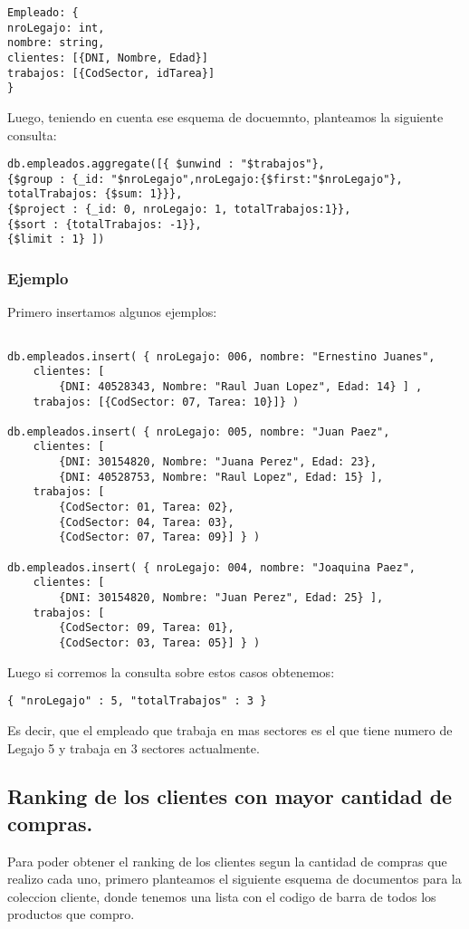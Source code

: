 \begin{lstlisting}
Empleado: {
nroLegajo: int,
nombre: string,
clientes: [{DNI, Nombre, Edad}]
trabajos: [{CodSector, idTarea}]
}
\end{lstlisting}

Luego, teniendo en cuenta ese esquema de docuemnto, planteamos la siguiente consulta:
\begin{lstlisting}
db.empleados.aggregate([{ $unwind : "$trabajos"},
{$group : {_id: "$nroLegajo",nroLegajo:{$first:"$nroLegajo"},
totalTrabajos: {$sum: 1}}},
{$project : {_id: 0, nroLegajo: 1, totalTrabajos:1}},
{$sort : {totalTrabajos: -1}},
{$limit : 1} ])
\end{lstlisting}

\subsubsection{Ejemplo}

Primero insertamos algunos ejemplos:
\begin{lstlisting}

db.empleados.insert( { nroLegajo: 006, nombre: "Ernestino Juanes",
	clientes: [
		{DNI: 40528343, Nombre: "Raul Juan Lopez", Edad: 14} ] ,
	trabajos: [{CodSector: 07, Tarea: 10}]} )

db.empleados.insert( { nroLegajo: 005, nombre: "Juan Paez",
	clientes: [
		{DNI: 30154820, Nombre: "Juana Perez", Edad: 23},
		{DNI: 40528753, Nombre: "Raul Lopez", Edad: 15} ],
	trabajos: [
		{CodSector: 01, Tarea: 02},
		{CodSector: 04, Tarea: 03},
		{CodSector: 07, Tarea: 09}] } )

db.empleados.insert( { nroLegajo: 004, nombre: "Joaquina Paez",
	clientes: [
		{DNI: 30154820, Nombre: "Juan Perez", Edad: 25} ],
	trabajos: [
		{CodSector: 09, Tarea: 01},
		{CodSector: 03, Tarea: 05}] } )

\end{lstlisting}

Luego si corremos la consulta sobre estos casos obtenemos:

\begin{lstlisting}
{ "nroLegajo" : 5, "totalTrabajos" : 3 }
\end{lstlisting}
Es decir, que el empleado que trabaja en mas sectores es el que tiene numero de Legajo 5 y trabaja en 3 sectores actualmente.

\subsection{Ranking de los clientes con mayor cantidad de compras.}
Para poder obtener el ranking de los clientes segun la cantidad de compras que realizo cada uno, primero
planteamos el siguiente esquema de documentos para la coleccion cliente, donde tenemos una lista con el codigo de barra de todos los productos que compro.

